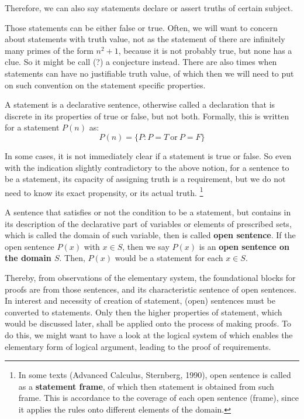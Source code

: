 Therefore, we can also say statements declare or assert truths of certain subject. 

Those statements can be either false or true. Often, we will want to concern about statements with truth value, not as the statement of there are infinitely many primes of the form $n^{2}+1$, because it is not probably true, but none has a clue. So it might be call (?) a conjecture instead. There are also times when statements can have no justifiable truth value, of which then we will need to put on such convention on the statement specific properties. 

\begin{definition}[Statements, II]
    A statement is a declarative sentence, otherwise called a declaration that is discrete in its properties of true or false, but not both. Formally, this is written for a statement $P(n)$ as: 
    \begin{equation}
        P(n)=\{P: P=T \: \text{or}\: P = F\}
    \end{equation}
\end{definition}

In some cases, it is not immediately clear if a statement is true or false. So even with the indication slightly contradictory to the above notion, for a sentence to be a statement, its capacity of assigning truth is a requirement, but we do not need to know its exact propensity, or its actual truth.   
\footnote{In some texts (Advanced Calculus, Sternberg, 1990), open sentence is called as a \textbf{statement frame}, of which then statement is obtained from such frame. This is accordance to the coverage of each open sentence (frame), since it applies the rules onto different elements of the domain.}

A sentence that satisfies or not the condition to be a statement, but contains in its description of the declarative part of variables or elements of prescribed sets, which is called the domain of such variable, then is called \textbf{open sentence}. If the  open sentence $P(x)$ with \(x \in S\), then we say \(P(x)\) is an \textbf{open sentence on the domain $S$}. Then, $P(x)$ would be a statement for each $x\in S$. 

Thereby, from observations of the elementary system, the foundational blocks for proofs are from those sentences, and its characteristic sentence of open sentences. In interest and necessity of creation of statement, (open) sentences must be converted to statements. Only then the higher properties of statement, which would be discussed later, shall be applied onto the process of making proofs. To do this, we might want to have a look at the logical system of which enables the elementary form of logical argument, leading to the proof of requirements. 

